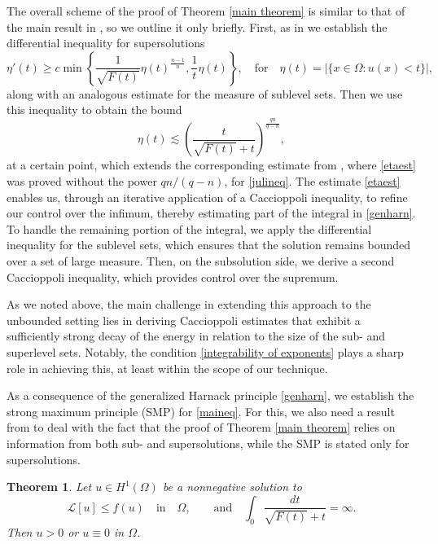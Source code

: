 \documentclass[12pt,a4paper]{amsart}
\numberwithin{equation}{section} %
\newtheorem{theorem}{Theorem}
\theoremstyle{definition}
\theoremstyle{remark}
\begin{document}
The overall scheme of the proof of Theorem \ref{main theorem} is similar to that of the main result in \cite{VJ1}, so we outline it only briefly. First, as in \cite{VJ1}  we establish the differential inequality for supersolutions
$$
    \eta'(t) \geq c \min\left\{\frac{1}{\sqrt{F(t)}}\eta(t)^{\frac{n-1}{n}}, \frac{1}{t}\eta(t) \right\}, \quad \text{for} \quad \eta(t) = |\{x \in \Omega \colon u(x) < t \}|,
$$
along with an analogous estimate for the measure of sublevel sets. Then we use this inequality to obtain the bound
\begin{equation}\label{etaest}
    \eta(t) \lesssim
  \left(\frac{t}{\sqrt{F(t)} + t} \right)^\frac{q n}{q-n},
\end{equation}
at a certain point, which extends the corresponding estimate from \cite{VJ1}, where \eqref{etaest} was proved without the power $qn/(q-n)$, for \eqref{julineq}. The estimate \eqref{etaest} enables us, through an iterative application of a Caccioppoli inequality, to refine our control over the infimum, thereby estimating part of the integral in \eqref{genharn}. To handle the remaining portion of the integral, we apply the differential inequality for the sublevel sets, which ensures that the solution remains bounded over a set of large measure. Then, on the subsolution side, we derive a second Caccioppoli inequality, which provides control over the supremum.

As we noted above, the main challenge in extending this approach to the unbounded setting lies in deriving Caccioppoli estimates that exhibit a sufficiently strong decay of the energy in relation to the size of the sub- and superlevel sets. Notably, the condition \eqref{integrability of exponents} plays a sharp role in achieving this, at least within the scope of our technique.


As a consequence of the generalized Harnack principle \eqref{genharn}, we establish the strong maximum principle (SMP) for \eqref{maineq}. For this, we also need a result from \cite{SS21} to deal with the fact that the proof of Theorem \ref{main theorem} relies on information from both sub- and supersolutions, while the SMP is stated only for supersolutions. 
 
\begin{theorem}\label{maximum principle}
Let $u \in H^1(\Omega)$ be a nonnegative solution to  
$$
    \mathcal{L}[u] \leq f(u) \quad \text{in} \quad \Omega,\qquad\mbox{and} 
\quad
    \int_{0}\frac{dt}{\sqrt{F(t)}+t} = \infty.
$$  
Then $u > 0$ or $u \equiv 0$ in $\Omega$.
\end{theorem}
\end{document}
